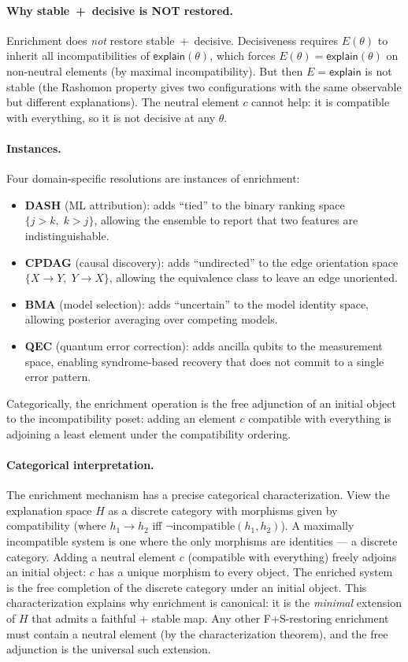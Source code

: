 \documentclass[11pt,a4paper]{article}
\begin{document}
\paragraph{Why stable~+~decisive is NOT restored.}
Enrichment does \emph{not} restore stable~+~decisive.  Decisiveness requires $E(\theta)$ to inherit all incompatibilities of $\mathsf{explain}(\theta)$, which forces $E(\theta) = \mathsf{explain}(\theta)$ on non-neutral elements (by maximal incompatibility).  But then $E = \mathsf{explain}$ is not stable (the Rashomon property gives two configurations with the same observable but different explanations).  The neutral element $c$ cannot help: it is compatible with everything, so it is not decisive at any $\theta$.

\paragraph{Instances.}
Four domain-specific resolutions are instances of enrichment:
\begin{itemize}[nosep]
  \item \textbf{DASH} (ML attribution): adds ``tied'' to the binary ranking space $\{j > k, \; k > j\}$, allowing the ensemble to report that two features are indistinguishable.
  \item \textbf{CPDAG} (causal discovery): adds ``undirected'' to the edge orientation space $\{X \to Y, \; Y \to X\}$, allowing the equivalence class to leave an edge unoriented.
  \item \textbf{BMA} (model selection): adds ``uncertain'' to the model identity space, allowing posterior averaging over competing models.
  \item \textbf{QEC} (quantum error correction): adds ancilla qubits to the measurement space, enabling syndrome-based recovery that does not commit to a single error pattern.
\end{itemize}

Categorically, the enrichment operation is the free adjunction of an initial object to the incompatibility poset: adding an element $c$ compatible with everything is adjoining a least element under the compatibility ordering.

\paragraph{Categorical interpretation.} The enrichment mechanism has a precise categorical characterization. View the explanation space $H$ as a discrete category with morphisms given by compatibility (where $h_1 \to h_2$ iff $\lnot\mathrm{incompatible}(h_1, h_2)$). A maximally incompatible system is one where the only morphisms are identities --- a discrete category. Adding a neutral element $c$ (compatible with everything) freely adjoins an initial object: $c$ has a unique morphism to every object. The enriched system is the free completion of the discrete category under an initial object. This characterization explains why enrichment is canonical: it is the \emph{minimal} extension of $H$ that admits a faithful + stable map. Any other F+S-restoring enrichment must contain a neutral element (by the characterization theorem), and the free adjunction is the universal such extension.
\end{document}
